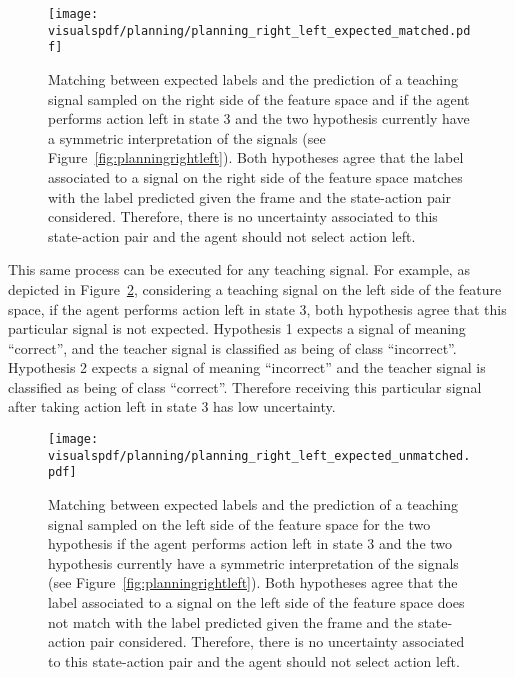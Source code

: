 \begin{figure}[H]
  \centering
  \texttt{[image: \\visualspdf/planning/planning\_right\_left\_expected\_matched.pdf]}
  \caption{Matching between expected labels and the prediction of a teaching signal sampled on the right side of the feature space and if the agent performs action left in state 3 and the two hypothesis currently have a symmetric interpretation of the signals (see Figure~\ref{fig:planningrightleft}). Both hypotheses agree that the label associated to a signal on the right side of the feature space matches with the label predicted given the frame and the state-action pair considered. Therefore, there is no uncertainty associated to this state-action pair and the agent should not select action left.}
  \label{fig:uncertaintymeaningrightleftexpectedleft}
\end{figure}

\newpage

This same process can be executed for any teaching signal. For example, as depicted in Figure~\ref{fig:uncertaintymeaningrightleftexpectedright}, considering a teaching signal on the left side of the feature space, if the agent performs action left in state 3, both hypothesis agree that this particular signal is not expected. Hypothesis 1 expects a signal of meaning ``correct'', and the teacher signal is classified as being of class ``incorrect''. Hypothesis 2 expects a signal of meaning ``incorrect'' and the teacher signal is classified as being of class ``correct''. Therefore receiving this particular signal after taking action left in state 3 has low uncertainty.

\begin{figure}[H]
  \centering
  \texttt{[image: \\visualspdf/planning/planning\_right\_left\_expected\_unmatched.pdf]}
  \caption{Matching between expected labels and the prediction of a teaching signal sampled on the left side of the feature space for the two hypothesis if the agent performs action left in state 3 and the two hypothesis currently have a symmetric interpretation of the signals (see Figure~\ref{fig:planningrightleft}). Both hypotheses agree that the label associated to a signal on the left side of the feature space does not match with the label predicted given the frame and the state-action pair considered. Therefore, there is no uncertainty associated to this state-action pair and the agent should not select action left.}
  \label{fig:uncertaintymeaningrightleftexpectedright}
\end{figure}

